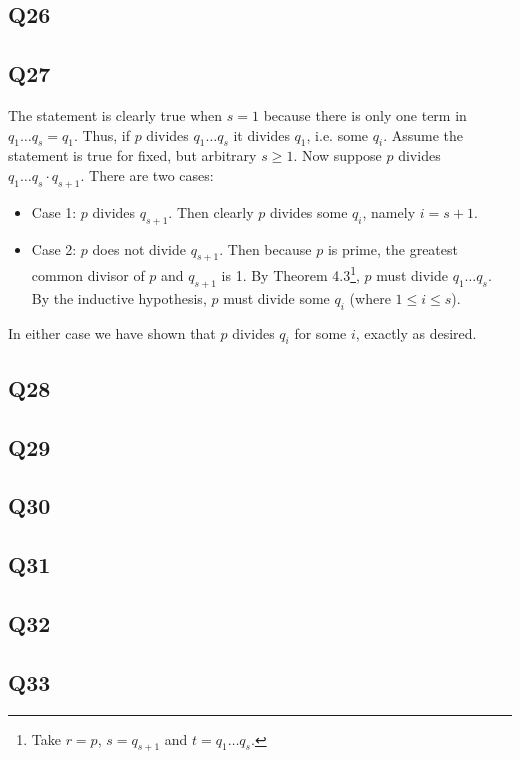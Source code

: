 \documentclass[12pt]{article}
\numberwithin{theorem}{section}
\numberwithin{equation}{section}
\numberwithin{remark}{section}
\numberwithin{definition}{section}
\numberwithin{theorem}{section}
\numberwithin{lemma}{section}
\numberwithin{example}{section}
\begin{document}
\subsection{Q26}

\subsection{Q27}

The statement is clearly true when $s=1$ because there is only one term in $q_1\ldots q_s=q_1$. Thus, if $p$ divides $q_1\ldots q_s$ it divides $q_1$, i.e. some $q_i$. Assume the statement is true for fixed, but arbitrary $s\ge1$. Now suppose $p$ divides $q_1\ldots q_s\cdot q_{s+1}$. There are two cases:
\begin{itemize}
	\item{Case 1: $p$ divides $q_{s+1}$. Then clearly $p$ divides some $q_i$, namely $i=s+1$.}
	\item{Case 2: $p$ does not divide $q_{s+1}$. Then because $p$ is prime, the greatest common divisor of $p$ and $q_{s+1}$ is 1. By Theorem 4.3\footnote{Take $r=p$, $s=q_{s+1}$ and $t=q_1\ldots q_s$.}, $p$ must divide $q_1\ldots q_s$. By the inductive hypothesis, $p$ must divide some $q_i$ (where $1\le i \le s$).}
\end{itemize}
In either case we have shown that $p$ divides $q_i$ for some $i$, exactly as desired. 



\subsection{Q28}

\subsection{Q29}

\subsection{Q30}

\subsection{Q31}

\subsection{Q32}

\subsection{Q33}
\end{document}

